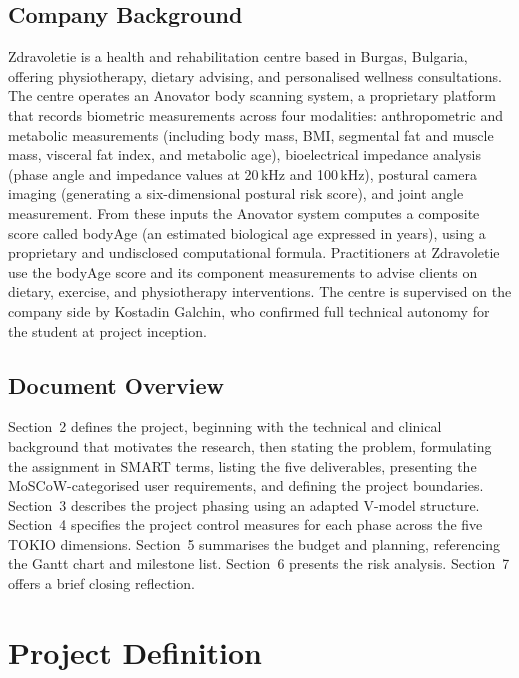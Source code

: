\documentclass[11pt,a4paper]{article}
\begin{document}
\subsection{Company Background}

Zdravoletie is a health and rehabilitation centre based in Burgas, Bulgaria, offering physiotherapy, dietary advising, and personalised wellness consultations. The centre operates an Anovator body scanning system, a proprietary platform that records biometric measurements across four modalities: anthropometric and metabolic measurements (including body mass, BMI, segmental fat and muscle mass, visceral fat index, and metabolic age), bioelectrical impedance analysis (phase angle and impedance values at 20\,kHz and 100\,kHz), postural camera imaging (generating a six-dimensional postural risk score), and joint angle measurement. From these inputs the Anovator system computes a composite score called bodyAge (an estimated biological age expressed in years), using a proprietary and undisclosed computational formula. Practitioners at Zdravoletie use the bodyAge score and its component measurements to advise clients on dietary, exercise, and physiotherapy interventions. The centre is supervised on the company side by Kostadin Galchin, who confirmed full technical autonomy for the student at project inception.

\subsection{Document Overview}

Section~2 defines the project, beginning with the technical and clinical background that motivates the research, then stating the problem, formulating the assignment in SMART terms, listing the five deliverables, presenting the MoSCoW-categorised user requirements, and defining the project boundaries. Section~3 describes the project phasing using an adapted V-model structure. Section~4 specifies the project control measures for each phase across the five TOKIO dimensions. Section~5 summarises the budget and planning, referencing the Gantt chart and milestone list. Section~6 presents the risk analysis. Section~7 offers a brief closing reflection.

\section{Project Definition}
\end{document}

